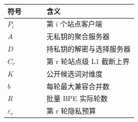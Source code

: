 \begin{tabular}{lp{0.70\linewidth}}
\toprule
符号 & 含义 \\
\midrule
$P_i$ & 第 i 个站点客户端 \\
$A$ & 无私钥的聚合服务器 \\
$D$ & 持私钥的解密与选择服务器 \\
$C_r$ & 第 r 轮站点级 L1 截断上界 \\
$K$ & 公开候选词对维度 \\
$b$ & 每轮最大兼容合并数 \\
$R$ & 批量 BPE 实际轮数 \\
$\varepsilon_r$ & 第 r 轮隐私预算 \\
\bottomrule
\end{tabular}
